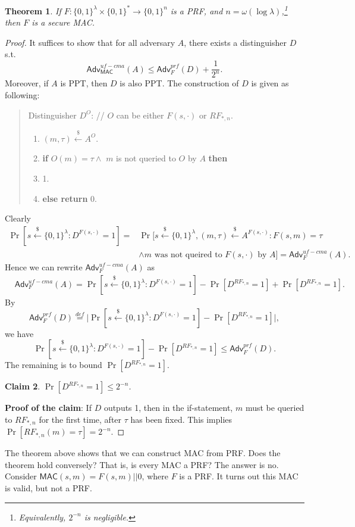\documentclass[12pt]{article}
\newcommand{\eqdef}{\stackrel{def}{=}}
\newcommand{\bits}{\{0,1\}}
\newcommand{\getsr}{\stackrel{\$}{\gets}}
\newcommand{\Adv}{\mathsf{Adv}}
\newcommand{\MAC}{\mathsf{MAC}}
\newcommand{\tab}{\hspace{0.3in}}
\newtheorem{theorem}{Theorem}[section]
\newtheorem{claim}[theorem]{Claim}
\theoremstyle{definition}
\begin{document}
\begin{theorem}
If $F : \bits^\lambda \times \bits^* \to \bits^n$ is a PRF, and $n = \omega(\log \lambda)$,\footnote{Equivalently, $2^{-n}$ is negligible.} then $F$ is a secure MAC.
\end{theorem}
\begin{proof}
It suffices to show that for all adversary $A$, there exists a distinguisher $D$ s.t.
$$\Adv_{\MAC}^{uf-cma}(A) \leq \Adv_{F}^{prf}(D) + \frac{1}{2^n}.$$
Moreover, if $A$ is PPT, then $D$ is also PPT. The construction of $D$ is given as following:
\begin{quote}
Distinguisher $D^O$: // $O$ can be either $F(s,\cdot)$ or $RF_{*,n}$.
\begin{enumerate}
\item $(m,\tau) \getsr A^O$.
\item {\bf if} $O(m) = \tau \wedge$ $m$ is not queried to $O$ by $A$ {\bf then}
\item \tab {\bf return} 1.
\item {\bf else return} 0.
\end{enumerate}
\end{quote}
Clearly
$$\begin{aligned}
\Pr[s\getsr\bits^\lambda: D^{F(s,\cdot)}=1] =& \Pr[s\getsr\bits^\lambda, (m,\tau) \getsr A^{F(s,\cdot)}: F(s,m) = \tau \\
&\wedge \textrm{$m$ was not queired to $F(s,\cdot)$ by $A$}] = \Adv_{F}^{uf-cma}(A).
\end{aligned}$$
Hence we can rewrite $\Adv_{F}^{uf-cma}(A)$ as
$$\begin{aligned}
&\Adv_{F}^{uf-cma}(A) 
= \Pr[s\getsr\bits^\lambda: D^{F(s,\cdot)}=1] - \Pr[D^{RF_{*,n}}=1] + \Pr[D^{RF_{*,n}}=1].
\end{aligned}$$
By 
$$\Adv_{F}^{prf}(D) \eqdef \bigg| \Pr[s\getsr\bits^\lambda: D^{F(s,\cdot)}=1] - \Pr[D^{RF_{*,n}}=1] \bigg|,$$
we have
$$\Pr[s\getsr\bits^\lambda: D^{F(s,\cdot)}=1] - \Pr[D^{RF_{*,n}}=1] \leq \Adv_{F}^{prf}(D).$$
The remaining is to bound $\Pr[D^{RF_{*,n}}=1]$.
\begin{claim}
$\Pr[D^{RF_{*,n}}=1] \leq 2^{-n}$.
\end{claim}
{\bf Proof of the claim}: If $D$ outputs 1, then in the if-statement, $m$ must be queried to $RF_{*,n}$ for the first time, after $\tau$ has been fixed. This implies $\Pr[RF_{*,n}(m) = \tau] = 2^{-n}$.
\end{proof}
The theorem above shows that we can construct MAC from PRF. Does the theorem hold conversely? That is, is every MAC a PRF? 
The answer is no. Consider $\MAC(s,m) = F(s,m)||0$, where $F$ is a PRF. It turns out this MAC is valid, but not a PRF.
\end{document}
